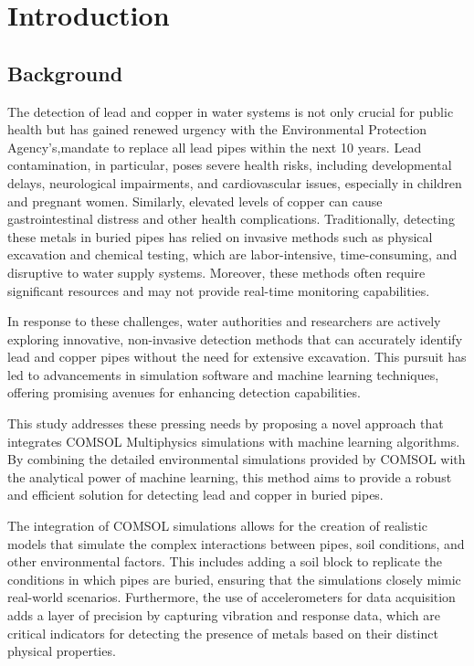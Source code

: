 

\chapter{Introduction}

\section{Background}
\label{sec:testbib}

The detection of lead and copper in water systems is not only crucial for public health but has gained renewed urgency with the Environmental Protection Agency's,\cite{barros_leak_2023}mandate to replace all lead pipes within the next 10 years. Lead contamination, in particular, poses severe health risks, including developmental delays, neurological impairments, and cardiovascular issues, especially in children and pregnant women. Similarly, elevated levels of copper can cause gastrointestinal distress and other health complications.
Traditionally, detecting these metals in buried pipes has relied on invasive methods such as physical excavation and chemical testing, which are labor-intensive, time-consuming, and disruptive to water supply systems. Moreover, these methods often require significant resources and may not provide real-time monitoring capabilities.

In response to these challenges, water authorities and researchers are actively exploring innovative, non-invasive detection methods that can accurately identify lead and copper pipes without the need for extensive excavation. This pursuit has led to advancements in simulation software and machine learning techniques, offering promising avenues for enhancing detection capabilities.

This study addresses these pressing needs by proposing a novel approach that integrates COMSOL Multiphysics simulations with machine learning algorithms. By combining the detailed environmental simulations provided by COMSOL with the analytical power of machine learning, this method aims to provide a robust and efficient solution for detecting lead and copper in buried pipes.

The integration of COMSOL simulations allows for the creation of realistic models that simulate the complex interactions between pipes, soil conditions, and other environmental factors. This includes adding a soil block to replicate the conditions in which pipes are buried, ensuring that the simulations closely mimic real-world scenarios. Furthermore, the use of accelerometers for data acquisition adds a layer of precision by capturing vibration and response data, which are critical indicators for detecting the presence of metals based on their distinct physical properties.

